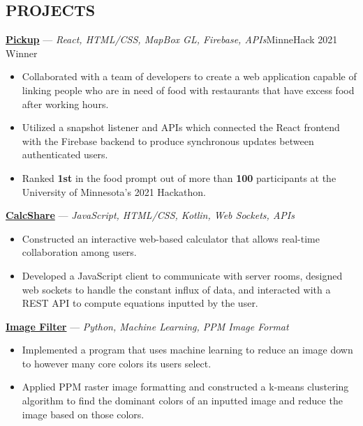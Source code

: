 \documentclass[11pt]{res}
\begin{document}
\begin{footnotesize}
\begin{resume}
\begin{small}
\section{PROJECTS}
\end{small} 
\vspace{.5mm}
\href{https://devpost.com/software/pickup-7b8yhx}{\textbf{Pickup}} — {\sl React, HTML/CSS, MapBox GL, Firebase, APIs}\hfill MinneHack 2021 Winner\vspace{-4.5mm}
\begin{itemize}[leftmargin=6.25mm] \itemsep -2pt 
\item Collaborated with a team of developers to create a web application capable of linking people who are in need of food with restaurants that have excess food after working hours.
\vspace{1.30mm}
\item Utilized a snapshot listener and APIs which connected the React frontend with the Firebase backend to produce synchronous updates between authenticated users. 
\vspace{1.30mm}
\item Ranked \textbf{1st} in the food prompt out of more than \textbf{100} participants at the University of Minnesota's 2021 Hackathon. 
\end{itemize}
\vspace{-2.5mm}
\href{https://github.com/CharlesShi12/CalcShare}{\textbf{CalcShare}} — {\sl JavaScript, HTML/CSS, Kotlin, Web Sockets, APIs} \vspace{-4.5mm}
\begin{itemize}[leftmargin=6.25mm] \itemsep -2pt 
\item Constructed an interactive web-based calculator that allows real-time collaboration among users. 
\vspace{1.30mm}
\item Developed a JavaScript client to communicate with server rooms, designed web sockets to handle the constant influx of data, and interacted with a REST API to compute equations inputted by the user. 
\end{itemize}
\vspace{-2.5mm}
\href{https://github.com/CharlesShi12/ImageFilters}{\textbf{Image Filter}} — {\sl Python, Machine Learning, PPM Image Format} \vspace{-4.5mm}
\begin{itemize}[leftmargin=6.25mm] \itemsep -2pt 
\item Implemented a program that uses machine learning to reduce an image down to however many core colors its users select.
\vspace{1.30mm}
\item Applied PPM raster image formatting and constructed a k-means clustering algorithm to find the dominant colors of an inputted image and reduce the image based on those colors. 
\end{itemize}
\begin{small}

\end{small}
\end{resume}
\end{footnotesize}
\end{document}
